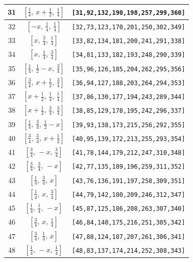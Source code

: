 \documentclass[fleqn,8pt]{jsarticle}
\begin{document}
\begin{longtable}{ccc}
31 & $\left[ \frac{1}{4},\, x + \frac{1}{2},\, \frac{1}{4} \right]$ & {\tt [31,92,132,190,198,257,299,360]} \\ \hline
32 & $\left[ - x,\, \frac{1}{4},\, \frac{1}{4} \right]$ & {\tt [32,73,123,170,201,250,302,349]} \\ \hline
33 & $\left[ x,\, \frac{3}{4},\, \frac{1}{4} \right]$ & {\tt [33,82,134,181,200,241,291,338]} \\ \hline
34 & $\left[ x,\, \frac{1}{4},\, \frac{3}{4} \right]$ & {\tt [34,81,133,182,193,248,290,339]} \\ \hline
35 & $\left[ \frac{1}{4},\, \frac{1}{2} - x,\, \frac{3}{4} \right]$ & {\tt [35,96,126,185,204,262,295,356]} \\ \hline
36 & $\left[ \frac{3}{4},\, x + \frac{1}{2},\, \frac{3}{4} \right]$ & {\tt [36,94,127,188,203,264,294,353]} \\ \hline
37 & $\left[ x + \frac{1}{2},\, \frac{1}{4},\, \frac{1}{4} \right]$ & {\tt [37,86,130,177,194,243,289,344]} \\ \hline
38 & $\left[ x + \frac{1}{2},\, \frac{3}{4},\, \frac{3}{4} \right]$ & {\tt [38,85,129,178,195,242,296,337]} \\ \hline
39 & $\left[ \frac{1}{4},\, \frac{3}{4},\, \frac{1}{2} - x \right]$ & {\tt [39,93,138,173,215,256,292,355]} \\ \hline
40 & $\left[ \frac{3}{4},\, \frac{3}{4},\, x + \frac{1}{2} \right]$ & {\tt [40,95,139,172,213,255,293,354]} \\ \hline
41 & $\left[ \frac{3}{4},\, - x,\, \frac{3}{4} \right]$ & {\tt [41,78,144,179,212,247,310,348]} \\ \hline
42 & $\left[ \frac{3}{4},\, \frac{3}{4},\, - x \right]$ & {\tt [42,77,135,189,196,259,311,352]} \\ \hline
43 & $\left[ \frac{1}{4},\, \frac{3}{4},\, x \right]$ & {\tt [43,76,136,191,197,258,309,351]} \\ \hline
44 & $\left[ \frac{1}{4},\, x,\, \frac{3}{4} \right]$ & {\tt [44,79,142,180,209,246,312,347]} \\ \hline
45 & $\left[ \frac{1}{4},\, \frac{1}{4},\, - x \right]$ & {\tt [45,87,125,186,208,263,307,340]} \\ \hline
46 & $\left[ \frac{3}{4},\, x,\, \frac{1}{4} \right]$ & {\tt [46,84,140,175,216,251,305,342]} \\ \hline
47 & $\left[ \frac{3}{4},\, \frac{1}{4},\, x \right]$ & {\tt [47,88,124,187,207,261,306,341]} \\ \hline
48 & $\left[ \frac{1}{4},\, - x,\, \frac{1}{4} \right]$ & {\tt [48,83,137,174,214,252,308,343]} \\
\end{longtable}
\end{document}
